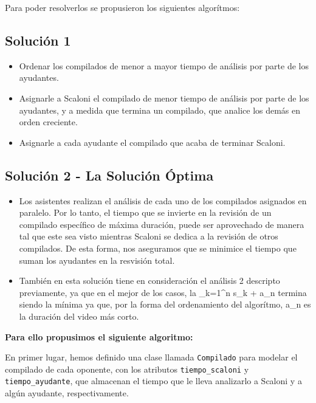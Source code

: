 Para poder resolverlos se propusieron los siguientes algorítmos:

\subsection{Solución 1}

\begin{itemize}
    \item Ordenar los compilados de menor a mayor tiempo de análisis por parte de los ayudantes.
    \item Asignarle a Scaloni el compilado de menor tiempo de análisis por parte de los ayudantes, 
    y a medida que termina un compilado, que analice los demás en orden creciente.
    \item Asignarle a cada ayudante el compilado que acaba de terminar Scaloni.
\end{itemize}

\subsection{Solución 2 - La Solución Óptima}

\begin{itemize}
    \item Los asistentes realizan el análisis de cada uno de los compilados asignados en paralelo. Por lo 
tanto, el tiempo que se invierte en la revisión de un compilado específico de máxima duración, 
puede ser aprovechado de manera tal que este sea visto mientras Scaloni se dedica a la revisión
de otros compilados. De esta forma, nos aseguramos que se minimice el tiempo que suman los ayudantes 
en la resvisión total. 
    \item También en esta solución tiene en consideración el análisis 2 descripto previamente, ya que en el mejor de los casos,
    la \sum_{k=1}^{n} s_k + a_n termina siendo la mínima ya que, por la forma del ordenamiento del algorítmo, a_n es la duración del video más corto.

\end{itemize}

\textbf{Para ello propusimos el siguiente algoritmo:}

En primer lugar, hemos definido una clase llamada \texttt{Compilado} para modelar el compilado de cada 
oponente, con los atributos \texttt{tiempo\_scaloni} y \texttt{tiempo\_ayudante}, que almacenan 
el tiempo que le lleva analizarlo a Scaloni y a algún ayudante, respectivamente.

